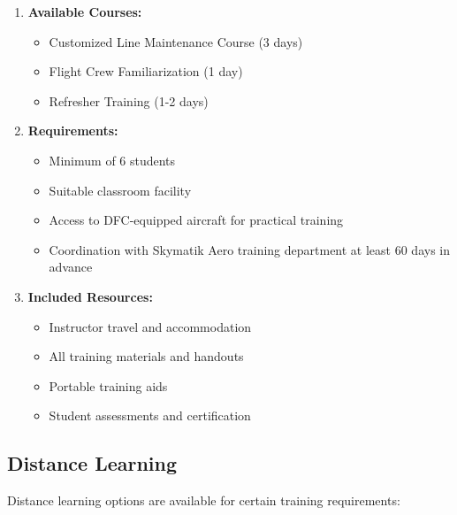 \documentclass[12pt,a4paper,twoside,openright]{book}
\begin{document}
\begin{enumerate}
    \item \textbf{Available Courses:}
    \begin{itemize}
        \item Customized Line Maintenance Course (3 days)
        \item Flight Crew Familiarization (1 day)
        \item Refresher Training (1-2 days)
    \end{itemize}
    
    \item \textbf{Requirements:}
    \begin{itemize}
        \item Minimum of 6 students
        \item Suitable classroom facility
        \item Access to DFC-equipped aircraft for practical training
        \item Coordination with Skymatik Aero training department at least 60 days in advance
    \end{itemize}
    
    \item \textbf{Included Resources:}
    \begin{itemize}
        \item Instructor travel and accommodation
        \item All training materials and handouts
        \item Portable training aids
        \item Student assessments and certification
    \end{itemize}
\end{enumerate}

\subsection{Distance Learning}

Distance learning options are available for certain training requirements:
\end{document}
